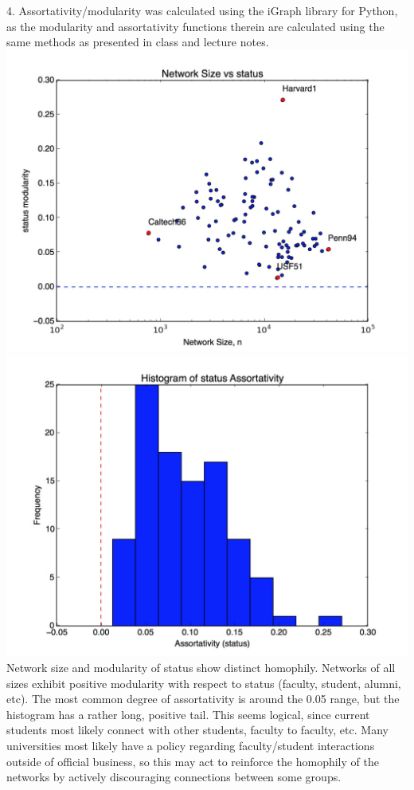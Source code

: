 \documentclass[11pt, oneside]{article}   	%
\begin{document}
4. Assortativity/modularity was calculated using the iGraph library for Python, as the modularity and assortativity functions therein are calculated using the same methods as presented in class and lecture notes.\\
\includegraphics[scale=.15]{status.jpg}\includegraphics[scale=.15]{statusHist.jpg}\\
\indent Network size and modularity of status show distinct homophily.  Networks of all sizes exhibit positive modularity with respect to status (faculty, student, alumni, etc).  The most common degree of assortativity is around the 0.05 range, but the histogram has a rather long, positive tail.  This seems logical, since current students most likely connect with other students, faculty to faculty, etc.  Many universities most likely have a policy regarding faculty/student interactions outside of official business, so this may act to reinforce the homophily of the networks by actively discouraging connections between some groups.\\\\
\end{document}
